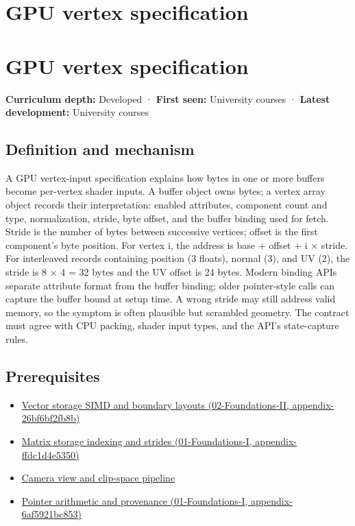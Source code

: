 \hypertarget{appendix-749ba51a6c25}{}
\section*{GPU vertex specification}
\section{GPU vertex specification}\label{appendix-749ba51a6c25-gpu-vertex-specification}

\textbf{Curriculum depth:} Developed · \textbf{First seen:} University courses · \textbf{Latest development:} University courses

\subsection{Definition and mechanism}\label{appendix-749ba51a6c25-definition-and-mechanism}

A GPU vertex-input specification explains how bytes in one or more buffers become per-vertex shader inputs. A buffer object owns bytes; a vertex array object records their interpretation: enabled attributes, component count and type, normalization, stride, byte offset, and the buffer binding used for fetch. Stride is the number of bytes between successive vertices; offset is the first component's byte position. For vertex i, the address is base + offset + i × stride. For interleaved records containing position (3 floats), normal (3), and UV (2), the stride is 8 × 4 = 32 bytes and the UV offset is 24 bytes. Modern binding APIs separate attribute format from the buffer binding; older pointer-style calls can capture the buffer bound at setup time. A wrong stride may still address valid memory, so the symptom is often plausible but scrambled geometry. The contract must agree with CPU packing, shader input types, and the API's state-capture rules.

\subsection{Prerequisites}\label{appendix-749ba51a6c25-prerequisites}

\begin{itemize}
\tightlist
\item
  \href{../02-Foundations-II/main.pdf\#nameddest=appendix-26bf6bf2fb8b}{Vector storage SIMD and boundary layouts (02-Foundations-II, appendix-26bf6bf2fb8b)}
\item
  \href{../01-Foundations-I/main.pdf\#nameddest=appendix-ffdc1d4e5350}{Matrix storage indexing and strides (01-Foundations-I, appendix-ffdc1d4e5350)}
\item
  \hyperref[appendix-1c07d64f5e70]{Camera view and clip-space pipeline}
\item
  \href{../01-Foundations-I/main.pdf\#nameddest=appendix-6af5921bc853}{Pointer arithmetic and provenance (01-Foundations-I, appendix-6af5921bc853)}
\end{itemize}


